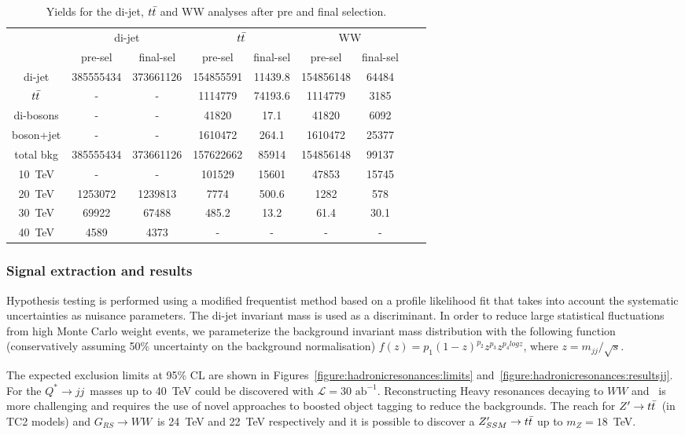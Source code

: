 \documentclass{cernrep}
\newcommand*{\intlumifcc}{\ensuremath{\mathcal{L}=30\text{ ab}^{-1}}}
\newcommand*{\zptt}{\ensuremath{Z^{\prime} \rightarrow \ttbar}}
\newcommand*{\qjj}{\ensuremath{Q^{*} \rightarrow jj}}
\newcommand*{\rsg}{\ensuremath{G_{RS} \rightarrow WW}}
\begin{document}
\begin{table}[htbp]
   \centering
\begin{tabular}{|c|c|c|c|c|c|c|c|c|}
  \hline
  & \multicolumn{2}{c|}{di-jet}  & \multicolumn{2}{c|}{$t\bar{t}$} & \multicolumn{2}{c|}{WW} \\
  \cline{2-7}

 & pre-sel & final-sel  & pre-sel & final-sel & pre-sel & final-sel\\
  \hline
  di-jet & 385555434 &  373661126 &  154855591 & 11439.8&  154856148 & 64484\\
  $t\bar{t}$ & - & - & 1114779 & 74193.6 &  1114779 & 3185\\
  di-bosons & - & - &  41820 &  17.1 &  41820 & 6092\\
  boson+jet & - & - & 1610472 & 264.1&  1610472 & 25377\\
  \hline
  total bkg  &  385555434& 373661126& 157622662 & 85914 & 154856148 & 99137\\
  \hline
  10~TeV &  - & - &  101529 & 15601 &  47853 & 15745\\
  20~TeV &   1253072 &  1239813& 7774 & 500.6 & 1282 & 578\\
  30~TeV &  69922 &  67488 & 485.2 & 13.2 &  61.4 & 30.1 \\
  40~TeV &  4589 &  4373 & - & - & - & -\\
  \hline
\end{tabular}
  \caption{Yields for the di-jet, $t\bar{t}$ and WW analyses after pre and final selection.}
  \label{tab:hadronicresonances:yields}
\end{table}

\subsubsection{Signal extraction and results}
Hypothesis testing is performed using a modified frequentist method based on a profile likelihood fit that takes into account the systematic uncertainties as nuisance parameters. The di-jet invariant mass is used as a discriminant. In order to reduce large statistical fluctuations from high Monte Carlo weight events, we parameterize the background invariant mass distribution with the following function (conservatively assuming 50\% uncertainty on the background normalisation) $f(z)=p_1(1-z)^{p_2}z^{p_3}z^{p_{4}logz}$, where $z=m_{jj}/\sqrt{s}$.

The expected exclusion limits at 95\% CL are shown in Figures~\ref{figure:hadronicresonances:limits} and~\ref{figure:hadronicresonances:resultsjj}. For the \qjj\ masses up to 40~TeV could be discovered with \intlumifcc. Reconstructing Heavy resonances decaying to $WW$ and \ttbar\ is more challenging and requires the use of novel approaches to boosted object tagging to reduce the backgrounds. The reach for \zptt\ (in TC2 models) and \rsg\ is 24~TeV and 22~TeV respectively and it is possible to discover a $Z^{\prime}_{SSM} \rightarrow t\bar{t}$ up to $m_{Z}=18$~TeV.
\end{document}
